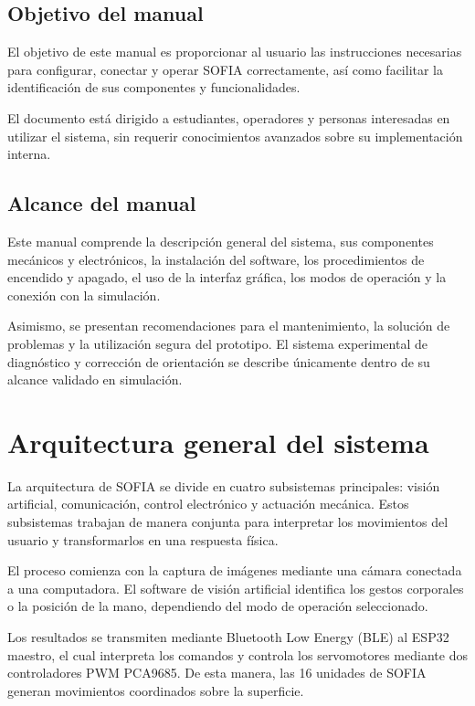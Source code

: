 \documentclass[letterpaper,journal]{IEEEtran}
\begin{document}
\subsection{Objetivo del manual}

El objetivo de este manual es proporcionar al usuario las
instrucciones necesarias para configurar, conectar y operar
SOFIA correctamente, así como facilitar la identificación de
sus componentes y funcionalidades.

El documento está dirigido a estudiantes, operadores y
personas interesadas en utilizar el sistema, sin requerir
conocimientos avanzados sobre su implementación interna.

\subsection{Alcance del manual}

Este manual comprende la descripción general del sistema,
sus componentes mecánicos y electrónicos, la instalación del
software, los procedimientos de encendido y apagado, el uso
de la interfaz gráfica, los modos de operación y la conexión
con la simulación.

Asimismo, se presentan recomendaciones para el mantenimiento,
la solución de problemas y la utilización segura del prototipo.
El sistema experimental de diagnóstico y corrección de
orientación se describe únicamente dentro de su alcance
validado en simulación.

\section{Arquitectura general del sistema}
\label{sec:arquitectura}

La arquitectura de SOFIA se divide en cuatro subsistemas
principales: visión artificial, comunicación, control
electrónico y actuación mecánica. Estos subsistemas trabajan
de manera conjunta para interpretar los movimientos del
usuario y transformarlos en una respuesta física.

El proceso comienza con la captura de imágenes mediante una
cámara conectada a una computadora. El software de visión
artificial identifica los gestos corporales o la posición de
la mano, dependiendo del modo de operación seleccionado.

Los resultados se transmiten mediante Bluetooth Low Energy
(BLE) al ESP32 maestro, el cual interpreta los comandos y
controla los servomotores mediante dos controladores PWM
PCA9685. De esta manera, las 16 unidades de SOFIA generan
movimientos coordinados sobre la superficie.
\end{document}
